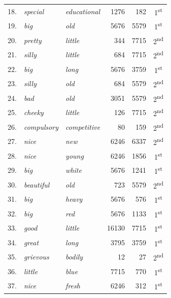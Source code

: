 \begin{table}
{\begin{tabular}[t]{rllrrc}
18. & \textit{special} & \textit{educational} & \num{1276} & \num{182} & 1\textsuperscript{st} \\
19. & \textit{big} & \textit{old} & \num{5676} & \num{5579} & 1\textsuperscript{st} \\
20. & \textit{pretty} & \textit{little} & \num{344} & \num{7715} & 2\textsuperscript{nd} \\
21. & \textit{silly} & \textit{little} & \num{684} & \num{7715} & 2\textsuperscript{nd} \\
22. & \textit{big} & \textit{long} & \num{5676} & \num{3759} & 1\textsuperscript{st} \\
23. & \textit{silly} & \textit{old} & \num{684} & \num{5579} & 2\textsuperscript{nd} \\
24. & \textit{bad} & \textit{old} & \num{3051} & \num{5579} & 2\textsuperscript{nd} \\
25. & \textit{cheeky} & \textit{little} & \num{126} & \num{7715} & 2\textsuperscript{nd} \\
26. & \textit{compulsory} & \textit{competitive} & \num{80} & \num{159} & 2\textsuperscript{nd} \\
27. & \textit{nice} & \textit{new} & \num{6246} & \num{6337} & 2\textsuperscript{nd} \\
28. & \textit{nice} & \textit{young} & \num{6246} & \num{1856} & 1\textsuperscript{st} \\
29. & \textit{big} & \textit{white} & \num{5676} & \num{1241} & 1\textsuperscript{st} \\
30. & \textit{beautiful} & \textit{old} & \num{723} & \num{5579} & 2\textsuperscript{nd} \\
31. & \textit{big} & \textit{heavy} & \num{5676} & \num{576} & 1\textsuperscript{st} \\
32. & \textit{big} & \textit{red} & \num{5676} & \num{1133} & 1\textsuperscript{st} \\
33. & \textit{good} & \textit{little} & \num{16130} & \num{7715} & 1\textsuperscript{st} \\
34. & \textit{great} & \textit{long} & \num{3795} & \num{3759} & 1\textsuperscript{st} \\
35. & \textit{grievous} & \textit{bodily} & \num{12} & \num{27} & 2\textsuperscript{nd} \\
36. & \textit{little} & \textit{blue} & \num{7715} & \num{770} & 1\textsuperscript{st} \\
37. & \textit{nice} & \textit{fresh} & \num{6246} & \num{312} & 1\textsuperscript{st} \\

\end{tabular}}
\end{table}

